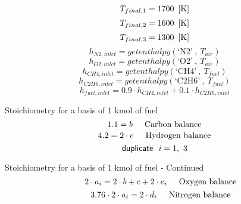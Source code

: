 \documentclass[10pt,fleqn]{article}
\newcommand{\F}[1]{\mbox{$#1$}}
\newcommand{\K}[1]{\mbox{\sf#1\ \ \mit}}
\newcommand{\SC}[1]{\mbox{`#1'}\  }
\newcommand{\V}[1]{\mbox{$ #1 $}}
\newcommand{\I}{\mbox{\hspace{0.20in}}}
\begin{document}
\rm
\begin{equation}
\label{EES Eqn:6}
T_{final,1}= 1700   \   \left[ \rm K \right] 
\end{equation}
\rm
\begin{equation}
\label{EES Eqn:7}
T_{final,2}= 1600   \   \left[ \rm K \right] 
\end{equation}
\rm
\begin{equation}
\label{EES Eqn:8}
T_{final,3}= 1300   \   \left[ \rm K \right] 
\end{equation}
\rm
\begin{equation}
\label{EES Eqn:9}
h_{N2,inlet} = \F{getenthalpy}{ \left( \SC{N2},\ T_{air} \right) } 
\end{equation}
\begin{equation}
\label{EES Eqn:10}
h_{O2,inlet} = \F{getenthalpy}{ \left( \SC{O2},\ T_{air} \right) } 
\end{equation}
\begin{equation}
\label{EES Eqn:11}
h_{CH4,inlet} = \F{getenthalpy}{ \left( \SC{CH4},\ T_{fuel} \right) } 
\end{equation}
\begin{equation}
\label{EES Eqn:12}
h_{C2H6,inlet} = \F{getenthalpy}{ \left( \SC{C2H6},\ T_{fuel} \right) } 
\end{equation}
\begin{equation}
\label{EES Eqn:13}
h_{fuel,inlet} = 0.9 \cdot  h_{CH4,inlet} + 0.1 \cdot  h_{C2H6,inlet} 
\end{equation}

\vspace{0.04in}
\noindent
\rm Stoichiometry for a basis of 1 kmol of fuel
\begin{equation}
\label{EES Eqn:14}
1.1 = \V{b	}  
\mbox{\I Carbon balance}
\end{equation}
\begin{equation}
\label{EES Eqn:15}
4.2 =  2 \cdot  \V{c	}  
\mbox{\I Hydrogen balance}
\end{equation}
\begin{equation}
\label{EES Eqn:16}
\K{duplicate} i=1,\ 3 
\end{equation}

\vspace{0.04in}
\noindent
\rm Stoichiometry for a basis of 1 kmol of fuel - Continued
\begin{equation}
\I \label{EES Eqn:17}
2 \cdot  a_{i} = 2 \cdot  b + c + 2 \cdot  e_{i}	 
\mbox{\I Oxygen balance}
\end{equation}
\begin{equation}
\I \label{EES Eqn:18}
3.76 \cdot  2 \cdot  a_{i} = 2 \cdot  d_{i}	 
\mbox{\I Nitrogen balance}
\end{equation}
\end{document}

